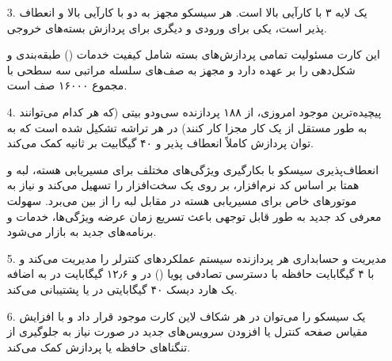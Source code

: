 \begin{qsolve}
	\begin{enumerate}
		\item [3.]
		یک  لایه ۳ با کارآیی بالا است. هر سیسکو  مجهز به دو  با کارآیی بالا و انعطاف پذیر است، یکی برای ورودی و دیگری برای پردازش بسته‌های خروجی.
		
		این کارت مسئولیت تمامی پردازش‌های بسته شامل کیفیت خدمات () طبقه‌بندی و شکل‌دهی را بر عهده دارد و مجهز به صف‌های سلسله مراتبی سه سطحی با مجموع ۱۶۰۰۰ صف است.
		
		\item [4.]
		پیچیده‌ترین  موجود امروزی، از ۱۸۸ پردازنده  سی‌و‌دو بیتی (که هر کدام می‌توانند به طور مستقل از یک کار مجزا کار کنند) در هر تراشه تشکیل شده است که به توان پردازش کاملاً انعطاف پذیر و ۴۰ گیگابیت بر ثانیه کمک می‌کند.
		
		انعطاف‌پذیری  سیسکو با بکارگیری ویژگی‌های مختلف برای مسیریابی هسته، لبه و همتا بر اساس کد نرم‌افزار، بر روی یک سخت‌افزار را تسهیل می‌کند و نیاز به موتورهای خاص برای مسیریابی هسته در مقابل لبه را از بین می‌برد. سهولت معرفی کد جدید به طور قابل توجهی باعث تسریع زمان عرضه ویژگی‌ها، خدمات و برنامه‌های جدید به بازار می‌شود.
		
		
		\item [5.]
		مدیریت و حسابداری هر پردازنده سیستم  عملکردهای کنترلر  را مدیریت می‌کند و با ۴ گیگابایت حافظه با دسترسی تصادفی پویا () در  و ۱۲٫۶ گیگابایت در  به اضافه یک هارد دیسک ۴۰ گیگابایتی در  یا  پشتیبانی می‌کند.
		
		
		\item [6.]
		یک سیسکو  را می‌توان در هر شکاف لاین کارت موجود قرار داد و با افزایش مقیاس صفحه کنترل یا افزودن سرویس‌های جدید در صورت نیاز به جلوگیری از تنگناهای حافظه یا پردازش کمک می‌کند.
		

\end{enumerate}
\end{qsolve}
